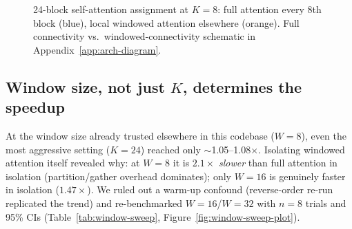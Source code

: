 \documentclass{article}
\begin{document}
\begin{figure}[t]
    \centering
    \caption{24-block self-attention assignment at $K{=}8$: full attention every 8th block (blue),
    local windowed attention elsewhere (orange). Full connectivity vs.\ windowed-connectivity
    schematic in Appendix~\ref{app:arch-diagram}.}
    \label{fig:block-strip}
\end{figure}

\subsection{Window size, not just $K$, determines the speedup}
\label{sec:window-size}
At the window size already trusted elsewhere in this codebase ($W{=}8$), even the most aggressive
setting ($K{=}24$) reached only $\sim$1.05--1.08$\times$. Isolating windowed attention itself
revealed why: at $W{=}8$ it is $2.1\times$ \emph{slower} than full attention in isolation
(partition/gather overhead dominates); only $W{=}16$ is genuinely faster in isolation
($1.47\times$). We ruled out a warm-up confound (reverse-order re-run replicated the trend) and
re-benchmarked $W{=}16$/$W{=}32$ with $n{=}8$ trials and 95\% CIs (Table~\ref{tab:window-sweep},
Figure~\ref{fig:window-sweep-plot}).
\end{document}
